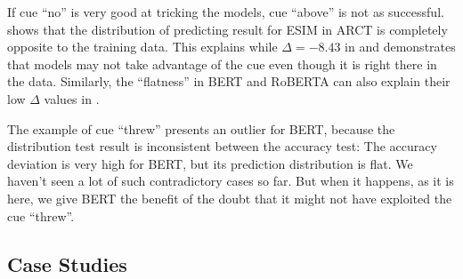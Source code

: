 If cue ``no'' is very good at tricking the models,
cue ``above'' is not as successful. 
 shows that 
the distribution of predicting result for ESIM in ARCT 
is completely opposite to the training data. 
This explains while $\Delta=-8.43$ in  and
demonstrates that models may not take advantage of the cue even though it is
right there in the data.
Similarly, the ``flatness'' in BERT and RoBERTA 
can also explain their low $\Delta$ values in . 

The example of cue ``threw'' presents an outlier for BERT,
because the distribution test result is inconsistent between the accuracy test: 
The accuracy deviation is very high for BERT, but its prediction distribution is
flat. We haven't seen a lot of such contradictory cases so far. 
But when it happens, as it is here, we give BERT the benefit of the doubt 
that it might not have exploited the cue ``threw''. 


%

\subsection{Case Studies}
